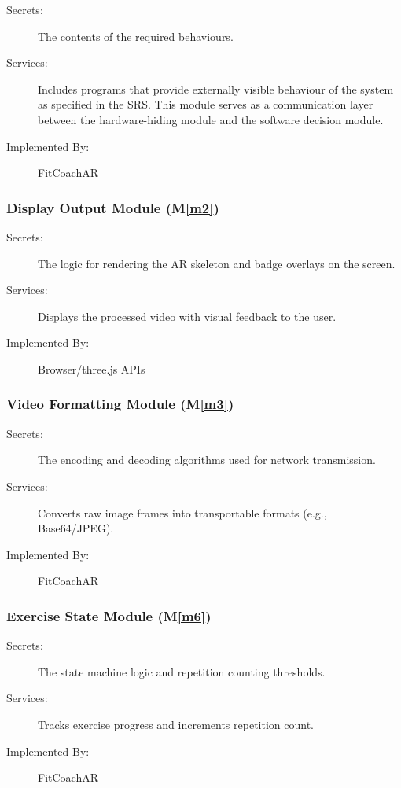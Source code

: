 \documentclass[12pt, titlepage]{article}
\newcommand{\mref}[1]{M\ref{#1}}
\begin{document}
\begin{description}
\item[Secrets:] The contents of the required behaviours.
\item[Services:] Includes programs that provide externally visible behaviour of
  the system as specified in the SRS. This module serves as a communication
  layer between the hardware-hiding module and the software decision module.
\item[Implemented By:] FitCoachAR
\end{description}

\subsubsection{Display Output Module (\mref{m2})}
\begin{description}
\item[Secrets:] The logic for rendering the AR skeleton and badge overlays on the screen.
\item[Services:] Displays the processed video with visual feedback to the user.
\item[Implemented By:] Browser/three.js APIs
\end{description}

\subsubsection{Video Formatting Module (\mref{m3})}
\begin{description}
\item[Secrets:] The encoding and decoding algorithms used for network transmission.
\item[Services:] Converts raw image frames into transportable formats (e.g., Base64/JPEG).
\item[Implemented By:] FitCoachAR
\end{description}

\subsubsection{Exercise State Module (\mref{m6})}
\begin{description}
\item[Secrets:] The state machine logic and repetition counting thresholds.
\item[Services:] Tracks exercise progress and increments repetition count.
\item[Implemented By:] FitCoachAR
\end{description}
\end{document}
